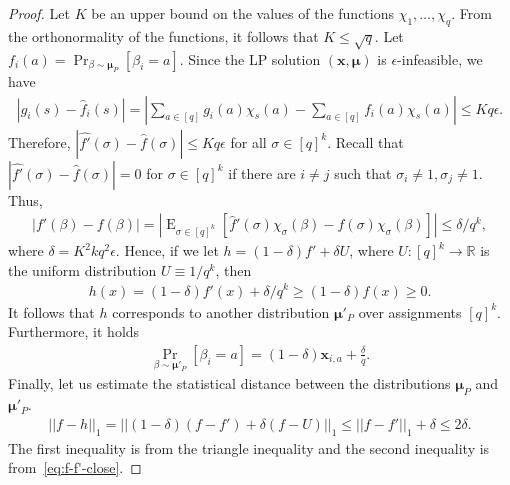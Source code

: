 \documentclass[letterpaper, 11pt]{article}
\newcommand{\bbR}{\mathbb{R}}
\newcommand{\bix}{\boldsymbol{x}}
\newcommand{\bimu}{\boldsymbol{\mu}}
\newcommand{\E}{\mathop{\mathrm{E}}}
\begin{document}
\begin{proof}
  Let $K$ be an upper bound on the values of the functions $\chi_1,\ldots,\chi_q$.
  From the orthonormality of the functions, 
  it follows that $K\leq \sqrt{q}$.
  Let $f_i(a)=\Pr_{\beta\sim \bimu_P}[\beta_i=a]$.
  Since the LP solution $(\bix,\bimu)$ is $\epsilon$-infeasible,
  we have
  \begin{eqnarray*}
    \left|\widehat{g}_i(s)-\widehat{f}_i(s)\right|
    =
    \left|\sum_{a\in [q]}g_i(a)\chi_s(a)-\sum_{a\in [q]}f_i(a)\chi_s(a)\right|
    \leq
    Kq\epsilon.
  \end{eqnarray*}
  Therefore, $|\widehat{f'}(\sigma)-\widehat{f}(\sigma)|\leq Kq\epsilon$ for all $\sigma\in [q]^k$.
  Recall that $|\widehat{f'}(\sigma)-\widehat{f}(\sigma)|=0$ for $\sigma\in [q]^k$ if there are $i\neq j$ such that $\sigma_i\neq 1, \sigma_j\neq 1$.
  Thus,
  \begin{eqnarray}
    |f'(\beta)-f(\beta)| = \left|\E_{\sigma\in [q]^k}\left[\widehat{f}'(\sigma)\chi_\sigma(\beta) - \widehat{f}(\sigma)\chi_\sigma(\beta)\right]\right|
    \leq
    \delta/q^k,
    \label{eq:f-f'-close}
  \end{eqnarray}
  where $\delta=K^2kq^2\epsilon$.
  Hence, if we let $h=(1-\delta)f'+\delta U$,
  where $U:[q]^k\to\bbR$ is the uniform distribution $U \equiv 1/q^k$,
  then
  \begin{eqnarray*}
    h(x)=(1-\delta)f'(x)+\delta/q^k\geq(1-\delta)f(x)\geq 0.
  \end{eqnarray*}
  It follows that $h$ corresponds to another distribution $\bimu'_P$ over assignments $[q]^k$.
  Furthermore, it holds 
  \begin{eqnarray*}
    \Pr_{\beta\sim \bimu'_P}[\beta_i=a]=(1-\delta)\bix_{i,a}+\frac{\delta}{q}.
  \end{eqnarray*}
  Finally, let us estimate the statistical distance between the distributions $\bimu_P$ and $\bimu'_P$.
  \begin{eqnarray*}
    ||f-h||_1
    =
    ||(1-\delta)(f-f')+\delta(f-U)||_1
    \leq
    ||f-f'||_1+\delta
    \leq
    2\delta.
  \end{eqnarray*}
  The first inequality is from the triangle inequality and the second inequality is from~\eqref{eq:f-f'-close}.
\end{proof}
\end{document}
